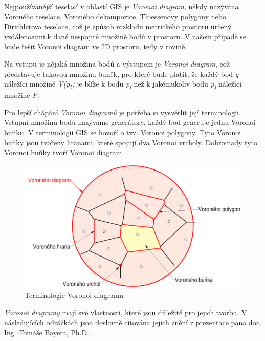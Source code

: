 Nejpoužívanější teselací v oblastí GIS je \textit{Voronoi diagram}, někdy nazývána Voroné\-ho teselace, Voroného dekompozice,
Thiessenovy polygony nebo Dirichletova teselace, což je způsob rozkladu 
metrického prostoru určený vzdálenostmi k dané nespojité množině bodů v prostoru.
V našem případě se bude řešit Voronoi diagram ve 2D prostoru, tedy v rovině.

Na vstupu je nějaká množina bodů a výstupem je \textit{Voronoi diagram}, 
což představuje takovou množinu buněk, pro které bude platit, že každý bod
\textit{q} náležící množině \textit{V(p\textsubscript{i})} je blíže k bodu
\textit{p\textsubscript{i}} než k jakémukoliv
bodu \textit{p\textsubscript{j}} náležící množině \textit{P}.  \cite{bayer-voronoi}

Pro lepší chápání \textit{Voronoi diagramů} je potřeba si vysvětlit její terminologii.
Vstup\-ní množinu bodů nazýváme generátory, každý bod generuje jednu Voronoi buňku. V 
terminologii GIS se hovoří o tzv. Voronoi polygony. Tyto Voronoi buňky jsou tvořeny hranami,
které spojují dva Voronoi vrcholy. Dohromady tyto Voronoi buňky tvoří Voronoi diagram.  

\begin{figure}[H] \centering
    \includegraphics[width=400pt]{./pictures/bayer-voronoi-terminologie.png}
    \caption[Terminologie Voronoi diagramu]{Terminologie Voronoi diagramu \cite{bayer-voronoi}}
	\label{fig:bayer-voronoi-terminologie}              
\end{figure}

\textit{Voronoi diagramy} mají své vlastnosti, které jsou důležité pro jejich tvorbu. V následujících
odrážkách jsou doslovně citována jejich znění z prezentace pana doc. Ing. Tomáše Bayera, Ph.D.


